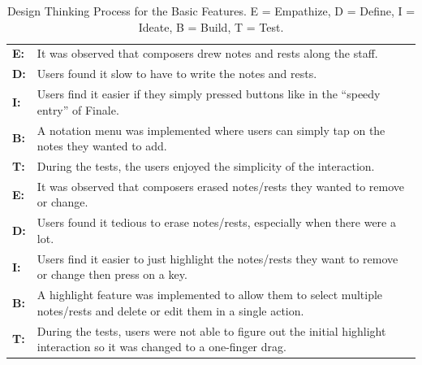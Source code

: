 		\begin{table} [H]
			\caption{Design Thinking Process for the Basic Features. E = Empathize, D = Define, I = Ideate, B = Build, T = Test.} \label{tab:design-thinking-basic}
			\vspace{0.20cm}   
			\begin{tabular}{|p{2.5cm} p{12.5cm}|}
			  	\hline

			  	\textbf{E:} 	& It was observed that composers drew notes and rests along the staff. \\
			  	\textbf{D:} 	& Users found it slow to have to write the notes and rests. \\
			  	\textbf{I:} 		& Users find it easier if they simply pressed buttons like in the ``speedy entry'' of Finale. \\
			  	\textbf{B:} 	& A notation menu was implemented where users can simply tap on the notes they wanted to add. \\
			  	\textbf{T:} 	& During the tests, the users enjoyed the simplicity of the interaction. \\
			  	\hline

			  	\textbf{E:} 	& It was observed that composers erased notes/rests they wanted to remove or change. \\
			  	\textbf{D:} 	& Users found it tedious to erase notes/rests, especially when there were a lot. \\
			  	\textbf{I:} 		& Users find it easier to just highlight the notes/rests they want to remove or change then press on a key. \\
			  	\textbf{B:} 	& A highlight feature was implemented to allow them to select multiple notes/rests and delete or edit them in a single action.  \\
			  	\textbf{T:} 	& During the tests, users were not able to figure out the initial highlight interaction so it was changed to a one-finger drag. \\
			  	\hline		  	
			\end{tabular}
		\end{table}

